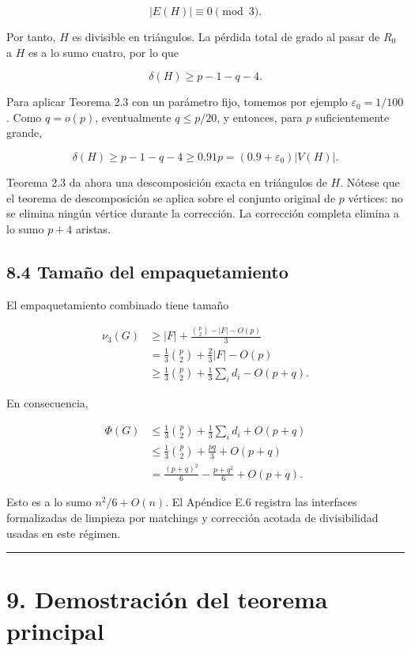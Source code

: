 \documentclass[spanish,11pt,a4paper]{article}
\begin{document}
\[
|E(H)|\equiv0\pmod3.
\]

Por tanto, \(H\) es divisible en triángulos. La pérdida total de grado
al pasar de \(R_0\) a \(H\) es a lo sumo cuatro, por lo que

\[
\delta(H)\ge p-1-q-4.
\tag{8.8}
\]

Para aplicar Teorema 2.3 con un parámetro fijo, tomemos por ejemplo
\(\varepsilon_0=1/100\). Como \(q=o(p)\), eventualmente \(q\le p/20\), y
entonces, para \(p\) suficientemente grande,

\[
\delta(H)\ge p-1-q-4\ge0.91p=(0.9+\varepsilon_0)|V(H)|.
\tag{8.9}
\]

Teorema 2.3 da ahora una descomposición exacta en triángulos de \(H\).
Nótese que el teorema de descomposición se aplica sobre el conjunto
original de \(p\) vértices: no se elimina ningún vértice durante la
corrección. La corrección completa elimina a lo sumo \(p+4\) aristas.

\subsection{8.4 Tamaño del
empaquetamiento}\label{tamauxf1o-del-empaquetamiento}

El empaquetamiento combinado tiene tamaño

\[
\begin{aligned}
\nu_3(G)
&\ge
|F|+\frac{\binom p2-|F|-O(p)}3\\
&=
\frac13\binom p2+\frac23|F|-O(p)\\
&\ge
\frac13\binom p2+\frac13\sum_i d_i-O(p+q).
\end{aligned}
\tag{8.10}
\]

En consecuencia,

\[
\begin{aligned}
\Phi(G)
&\le
\frac13\binom p2+\frac13\sum_i d_i+O(p+q)\\
&\le
\frac13\binom p2+\frac{pq}{3}+O(p+q)\\
&=
\frac{(p+q)^2}{6}-\frac{p+q^2}{6}+O(p+q).
\end{aligned}
\tag{8.11}
\]

Esto es a lo sumo \(n^2/6+O(n)\). El Apéndice E.6 registra las
interfaces formalizadas de limpieza por matchings y corrección acotada
de divisibilidad usadas en este régimen.

\begin{center}\rule{0.5\linewidth}{0.5pt}\end{center}

\section{9. Demostración del teorema
principal}\label{demostraciuxf3n-del-teorema-principal}
\end{document}
